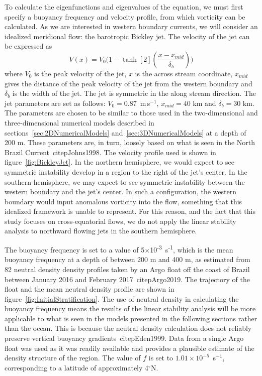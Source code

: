To calculate the eigenfunctions and eigenvalues of the equation, we must first specify a buoyancy frequency and velocity profile, from which vorticity can be calculated. As we are interested in western boundary currents, we will consider an idealized meridional flow: the barotropic Bickley jet. The velocity of the jet can be expressed as
\begin{equation}
    V(x) = V_0 \Bigg( 1 - \tanh[2](\frac{x - x_{mid}}{\delta_b})\Bigg)
\end{equation}
where $V_0$ is the peak velocity of the jet, $x$ is the across stream coordinate, $x_{mid}$ gives the distance of the peak velocity of the jet from the western boundary and $\delta_b$ is the width of the jet. The jet is symmetric in the along stream direction. The jet parameters are set as follows: $V_0 = 0.87$~m\,s$^{-1}$, $x_{mid} = 40$ km and $\delta_b = 30$ km. The parameters are chosen to be similar to those used in the two-dimensional and three-dimensional numerical models described in sections~\ref{sec:2DNumericalModels} and~\ref{sec:3DNumericalModels} at a depth of 200 m. These parameters are, in turn, loosely based on what is seen in the North Brazil Current~citep{Johns1998}. The velocity profile used is shown in figure~\ref{fig:BickleyJet}. In the northern hemisphere, we would expect to see symmetric instability develop in a region to the right of the jet's center. In the southern hemisphere, we may expect to see symmetric instability between the western boundary and the jet's center. In such a configuration, the western boundary would input anomalous vorticity into the flow, something that this idealized framework is unable to represent. For this reason, and the fact that this study focuses on cross-equatorial flows, we do not apply the linear stability analysis to northward flowing jets in the southern hemisphere.

The buoyancy frequency is set to a value of 5$\times$10\textsuperscript{-3}~s\textsuperscript{-1}, which is the mean buoyancy frequency at a depth of between 200 m and 400 m, as estimated from 82 neutral density density profiles taken by an Argo float off the coast of Brazil between January 2016 and February 2017~citep{Argo2019}. The trajectory of the float and the mean neutral density profile are shown in figure~\ref{fig:InitialStratification}. The use of neutral density in calculating the buoyancy frequency means the results of the linear stability analysis will be more applicable to what is seen in the models presented in the following sections rather than the ocean. This is because the neutral density calculation does not reliably preserve vertical buoyancy gradients~citep{Eden1999}. Data from a single Argo float was used as it was readily available and provides a plausible estimate of the density structure of the region. The value of $f$ is set to $1.01 \times 10^{-5}$~s$^{-1}$, corresponding to a latitude of approximately 4$^\circ$N.

